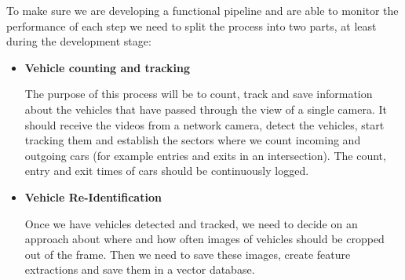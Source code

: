 \documentclass[conference]{IEEEtran} %
\begin{document}
		To make sure we are developing a functional pipeline and are able to monitor the performance of each step we need to split the process into two parts, at least during the development stage:
		
		\begin{itemize}
			\item \textbf{Vehicle counting and tracking}
			
			 The purpose of this process will be to count, track and save information about the vehicles that have passed through the view of a single camera. It should receive the videos from a network camera, detect the vehicles, start tracking them and establish the sectors where we count incoming and outgoing cars (for example entries and exits in an intersection). The count, entry and exit times of cars should be continuously logged.
			\item \textbf{Vehicle Re-Identification}
			
			 Once we have vehicles detected and tracked, we need to decide on an approach about where and how often images of vehicles should be cropped out of the frame. Then we need to save these images, create feature extractions and save them in a vector database.
		\end{itemize}
	
\end{document}
